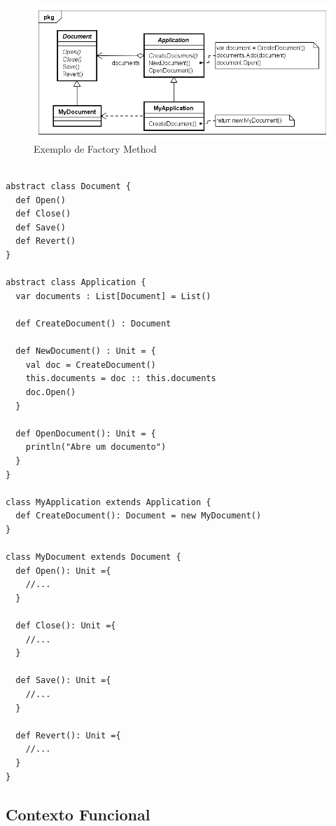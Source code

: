 \begin{figure}[htb]
	\caption{\label{fmethod_example}Exemplo de Factory Method}
	\begin{center}
	    \includegraphics[scale=0.5]{5_padroes-contexto-funcional/5.1_criacionais/5.1.1_factory-method/factorymethod_exemplo.png}
	\end{center}
\end{figure}

\begin{lstlisting}[caption={Factory Method Orientado a Objetos},label=oofactory]
    
abstract class Document {
  def Open()
  def Close()
  def Save()
  def Revert()
}

abstract class Application {
  var documents : List[Document] = List()

  def CreateDocument() : Document

  def NewDocument() : Unit = {
    val doc = CreateDocument()
    this.documents = doc :: this.documents
    doc.Open()
  }

  def OpenDocument(): Unit = {
    println("Abre um documento")
  }
}

class MyApplication extends Application {
  def CreateDocument(): Document = new MyDocument()
}

class MyDocument extends Document {
  def Open(): Unit ={
    //...
  }

  def Close(): Unit ={
    //...
  }

  def Save(): Unit ={
    //...
  }

  def Revert(): Unit ={
    //...
  }
}

\end{lstlisting}

\subsection*{Contexto Funcional}


